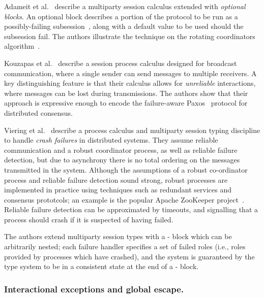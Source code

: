 \documentclass[
graybox,
envcountchap
]{svmult}
\begin{document}
\begin{bibunit}
  Adameit et al.~\cite{AdameitPN17:link-failures} describe a multiparty session
  calculus extended with \emph{optional blocks}. An optional block describes a
  portion of the protocol to be run as a possibly-failing
  subsession~\cite{DemangeonH12:subsessions}, along with a default value to be
  used should the subsession fail. The authors illustrate the technique on the
  rotating coordinators algorithm~\cite{Tel00:dist-algorithms}.


  Kouzapas et al.~\cite{KouzapasGVG19:async-broadcast} describe a session
  process calculus designed for broadcast communication, where a single sender
  can send messages to multiple
  receivers. A key distinguishing feature is that their calculus allows for
  \emph{unreliable} interactions, where messages can be lost during
  transmissions. The authors show that their approach is expressive enough to
  encode the failure-aware Paxos~\cite{Lamport98:paxos} protocol for distributed
  consensus.

  Viering et al.~\cite{VieringCEHZ18:crash-handling} describe a process calculus
  and multiparty session typing discipline to handle \emph{crash failures} in
  distributed systems. They assume reliable communication and a robust
  coordinator process, as well as reliable failure detection, but due to
  asynchrony there is no total ordering on the messages transmitted in the
  system.
%
  Although the assumptions of a robust co-ordinator process and reliable failure
  detection sound strong, robust processes are implemented in practice using
  techniques such as redundant services and consensus prototcols; an example is
  the popular Apache ZooKeeper project~\cite{JunqueiraR13:zookeeper}. Reliable
  failure detection can be approximated by timeouts, and signalling that a
  process should crash if it is suspected of having failed.

  The authors extend multiparty session types with a
  - block which can be arbitrarily nested; each failure
  handler specifies a set of failed roles (i.e., roles provided by processes
  which have crashed), and the system is guaranteed by the type system to be in
  a consistent state at the end of a - block.

  \subsubsection{Interactional exceptions and global escape.}


\end{bibunit}
\end{document}
